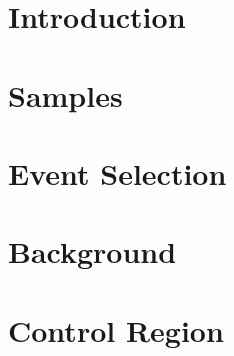\documentclass[UKenglish,texlive=2015,subcaption=true]{latex/atlasdoc}
\begin{document}
\maketitle
\tableofcontents



\section{Introduction}
\label{sec:intro}
 

\clearpage
\section{Samples}
\label{sec:samples}
 

\clearpage
\section{Event Selection}
\label{sec:selection}



\clearpage
\section{Background}
\label{sec:bkg}





\clearpage
\section{Control Region}
\label{sec:CR}

\end{document}
